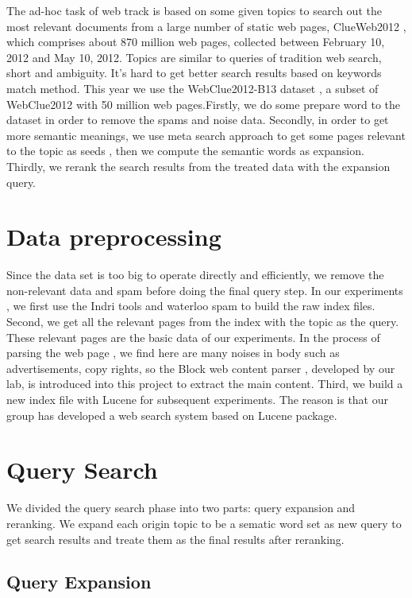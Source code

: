 \documentclass[runningheads,a4paper]{llncs}
\begin{document}
The ad-hoc task of web track is based on some given topics to search out the most relevant documents from a large number of static web pages, ClueWeb2012 \cite{clueweb2012}, which comprises about 870 million web pages, collected between February 10, 2012 and May 10, 2012. Topics are similar to queries of tradition web search, short and ambiguity. It's hard to get better search results based on keywords match method. This year we use the WebClue2012-B13 dataset , a subset of WebClue2012 with 50 million web pages.Firstly, we do some prepare word to the dataset in order to remove the spams and noise data. Secondly, in order to get more semantic meanings, we use meta search approach to get some pages relevant to the topic as seeds , then we compute the semantic words as expansion. Thirdly, we rerank the search results from the treated data with the expansion query. 

\section{Data preprocessing}

Since the data set is too big to operate directly and efficiently, we remove the non-relevant  data and spam before doing the final query step. In our experiments , we first use the Indri \cite{indri} tools and waterloo spam \cite{2011-Cormack-p441-465} to build the raw index files. Second, we get all the relevant pages from the index with the topic as the query. These relevant pages are the basic data of our experiments. In the process of parsing the web page , we find here are many noises    in body such as advertisements, copy rights, so the Block web content parser \cite{2012-Lin-p256-264} , developed by our lab,  is introduced into this project to extract the main content. Third, we build a new index file with Lucene \cite{lucene} for subsequent experiments.  The reason is that our group has developed a web search system based on Lucene package.

\section{Query Search}

We divided the query search phase into two parts: query expansion and reranking. We expand each origin topic to be a sematic word set as new query to get search results and treate them as the final results after reranking. 

\subsection{Query Expansion }
\end{document}
